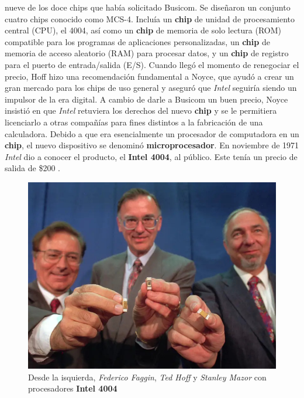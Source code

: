 nueve de los doce chips que había solicitado Busicom. Se diseñaron un conjunto cuatro chips conocido como MCS-4. Incluía un \textbf{chip} de
unidad de procesamiento central (CPU), el 4004, así como un \textbf{chip} de memoria de solo lectura (ROM) compatible para los programas de
aplicaciones personalizadas, un \textbf{chip} de memoria de acceso aleatorio (RAM) para procesar datos, y un \textbf{chip} de registro para el puerto
de entrada/salida (E/S). Cuando llegó el momento de renegociar el precio, Hoff hizo una recomendación fundamental a Noyce, que ayudó
a crear un gran mercado para los chips de uso general y aseguró que \emph{Intel} seguiría siendo un impulsor de la era digital. A cambio de
darle a Busicom un buen precio, Noyce insistió en que \emph{Intel} retuviera los derechos del nuevo \textbf{chip} y se le permitiera licenciarlo a otras 
compañías para fines distintos a la fabricación de una calculadora. Debido a que era esencialmente un procesador de computadora en un \textbf{chip},
el nuevo dispositivo se denominó \textbf{microprocesador}. En noviembre de 1971 \emph{Intel} dio a conocer el producto, el \textbf{Intel 4004}, al público.
Este tenía un precio de salida de \$200 .

\begin{figure}[htb]
	\centering
	\includegraphics[scale = 0.25]{Graphics/faggin_hoff_mazor_-4004.jpg}
	\caption{Desde la isquierda, \emph{Federico Faggin}, \emph{Ted Hoff} y \emph{Stanley Mazor} con procesadores \textbf{Intel 4004}}
	\label{fig:10}
\end{figure}

